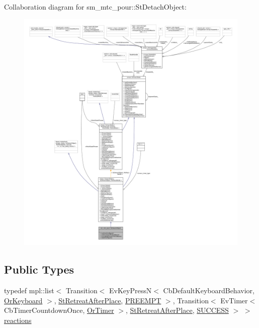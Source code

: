 Collaboration diagram for sm\+\_\+mtc\+\_\+pour\+:\+:St\+Detach\+Object\+:
\nopagebreak
\begin{figure}[H]
\begin{center}
\leavevmode
\includegraphics[width=350pt]{structsm__mtc__pour_1_1StDetachObject__coll__graph}
\end{center}
\end{figure}
\subsection*{Public Types}
\begin{DoxyCompactItemize}
\item 
typedef mpl\+::list$<$ Transition$<$ Ev\+Key\+PressN$<$ Cb\+Default\+Keyboard\+Behavior, \hyperlink{classsm__mtc__pour_1_1OrKeyboard}{Or\+Keyboard} $>$, \hyperlink{structsm__mtc__pour_1_1StRetreatAfterPlace}{St\+Retreat\+After\+Place}, \hyperlink{classPREEMPT}{P\+R\+E\+E\+M\+PT} $>$, Transition$<$ Ev\+Timer$<$ Cb\+Timer\+Countdown\+Once, \hyperlink{classsm__mtc__pour_1_1OrTimer}{Or\+Timer} $>$, \hyperlink{structsm__mtc__pour_1_1StRetreatAfterPlace}{St\+Retreat\+After\+Place}, \hyperlink{classSUCCESS}{S\+U\+C\+C\+E\+SS} $>$ $>$ \hyperlink{structsm__mtc__pour_1_1StDetachObject_ac2e4ab4d0a017971999d2a852f53a2b1}{reactions}
\end{DoxyCompactItemize}

